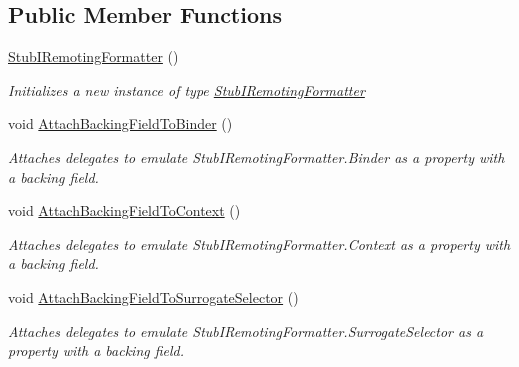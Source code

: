 \subsection*{Public Member Functions}
\begin{DoxyCompactItemize}
\item 
\hyperlink{class_system_1_1_runtime_1_1_remoting_1_1_messaging_1_1_fakes_1_1_stub_i_remoting_formatter_aea1222895cb662b2db2464c1e8f05795}{Stub\-I\-Remoting\-Formatter} ()
\begin{DoxyCompactList}\small\item\em Initializes a new instance of type \hyperlink{class_system_1_1_runtime_1_1_remoting_1_1_messaging_1_1_fakes_1_1_stub_i_remoting_formatter}{Stub\-I\-Remoting\-Formatter}\end{DoxyCompactList}\item 
void \hyperlink{class_system_1_1_runtime_1_1_remoting_1_1_messaging_1_1_fakes_1_1_stub_i_remoting_formatter_adb76d12d035128266ea17511c09cec18}{Attach\-Backing\-Field\-To\-Binder} ()
\begin{DoxyCompactList}\small\item\em Attaches delegates to emulate Stub\-I\-Remoting\-Formatter.\-Binder as a property with a backing field.\end{DoxyCompactList}\item 
void \hyperlink{class_system_1_1_runtime_1_1_remoting_1_1_messaging_1_1_fakes_1_1_stub_i_remoting_formatter_a6f4d8d0661899c56f6f417cb9f3e9615}{Attach\-Backing\-Field\-To\-Context} ()
\begin{DoxyCompactList}\small\item\em Attaches delegates to emulate Stub\-I\-Remoting\-Formatter.\-Context as a property with a backing field.\end{DoxyCompactList}\item 
void \hyperlink{class_system_1_1_runtime_1_1_remoting_1_1_messaging_1_1_fakes_1_1_stub_i_remoting_formatter_a533ae64b40abeed4e3af2a2281c5511f}{Attach\-Backing\-Field\-To\-Surrogate\-Selector} ()
\begin{DoxyCompactList}\small\item\em Attaches delegates to emulate Stub\-I\-Remoting\-Formatter.\-Surrogate\-Selector as a property with a backing field.\end{DoxyCompactList}\end{DoxyCompactItemize}
